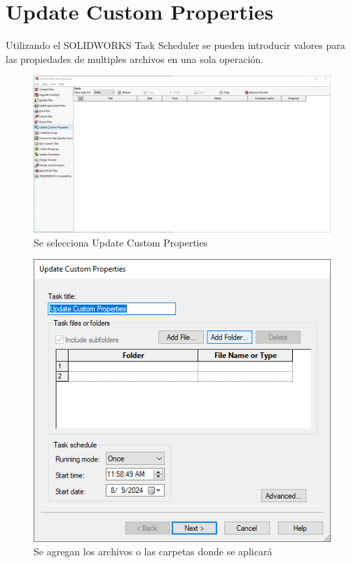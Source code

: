 \documentclass{report}
\begin{document}
\chapter{Update Custom Properties}

Utilizando el SOLIDWORKS Task Scheduler se pueden introducir valores para las propiedades de multiples archivos en una sola operación.

\begin{figure}[H]
	\centering
	\includegraphics[width=0.85\linewidth, height=0.5\textheight,keepaspectratio]{Imagenes/solidworks_updatecustomprop01}
	\caption{Se selecciona Update Custom Properties}
	\label{fig:solidworksupdatecustomprop01}
\end{figure}

\begin{figure}[H]
	\centering
	\includegraphics[width=0.65\linewidth, height=0.45\textheight,keepaspectratio]{Imagenes/solidworks_updatecustomprop02}
	\caption{Se agregan los archivos o las carpetas donde se aplicará}
	\label{fig:solidworksupdatecustomprop02}
\end{figure}
\end{document}
